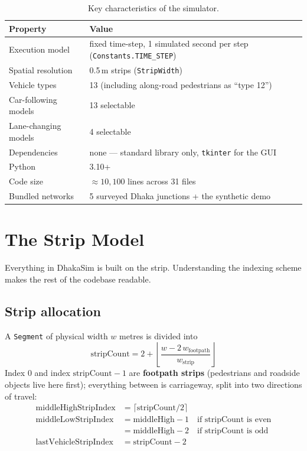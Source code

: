 \documentclass[11pt, a4paper]{article}
\newcommand{\code}[1]{\texttt{#1}}
\begin{document}
\begin{table}[h!]
\centering
\begin{tabularx}{\textwidth}{l X}
\toprule
\textbf{Property} & \textbf{Value} \\
\midrule
Execution model & fixed time-step, 1 simulated second per step (\code{Constants.TIME\_STEP}) \\
Spatial resolution & 0.5\,m strips (\code{StripWidth}) \\
Vehicle types & 13 (including along-road pedestrians as ``type 12'') \\
Car-following models & 13 selectable \\
Lane-changing models & 4 selectable \\
Dependencies & none --- standard library only, \code{tkinter} for the GUI \\
Python & 3.10+ \\
Code size & $\approx 10{,}100$ lines across 31 files \\
Bundled networks & 5 surveyed Dhaka junctions + the synthetic demo \\
\bottomrule
\end{tabularx}
\caption{Key characteristics of the simulator.}
\end{table}

\section{The Strip Model}
\label{sec:strips}

Everything in DhakaSim is built on the strip. Understanding the indexing scheme
makes the rest of the codebase readable.

\subsection{Strip allocation}

A \code{Segment} of physical width $w$ metres is divided into
\[
    \text{stripCount} = 2 + \left\lfloor
        \frac{w - 2\,w_{\text{footpath}}}{w_{\text{strip}}} \right\rfloor
\]
Index $0$ and index $\text{stripCount}-1$ are \textbf{footpath strips}
(pedestrians and roadside objects live here first); everything between is
carriageway, split into two directions of travel:
\begin{align*}
    \text{middleHighStripIndex}  &= \lceil \text{stripCount}/2 \rceil \\
    \text{middleLowStripIndex}   &= \text{middleHigh} - 1 \quad
        \text{if stripCount is even} \\
                                 &= \text{middleHigh} - 2 \quad
        \text{if stripCount is odd} \\
    \text{lastVehicleStripIndex} &= \text{stripCount} - 2
\end{align*}
\end{document}
